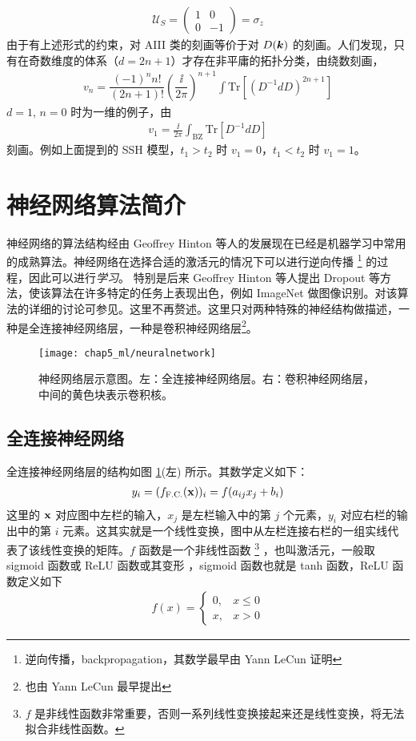 \begin{align}
\mathcal{U}_S = \begin{pmatrix}
1 & 0 \\
0 & -1 
\end{pmatrix} 
= \sigma_z
\end{align}
由于有上述形式的约束，对 AIII 类的刻画等价于对 $D(\boldsymbol{k})$ 的刻画。人们发现，只有在奇数维度的体系（$d=2n+1$）才存在非平庸的拓扑分类，由绕数刻画，
\begin{align}
v_n = \dfrac{(-1)^nn!}{(2n+1)!}\left(\dfrac{\ii}{2\pi}\right)^{n+1}
\int\text{Tr}[(D^{-1}dD)^{2n+1}]
\end{align}
$d=1$, $n=0$ 时为一维的例子，由
\begin{align}
v_1 = \frac{\ii}{2\pi}\int_{\text{BZ}}\text{Tr}[D^{-1}dD]
\end{align}
刻画。例如上面提到的 SSH 模型，$t_1>t_2$ 时 $v_1=0$，$t_1<t_2$ 时 $v_1=1$。



\section{神经网络算法简介} \label{sec:neuralnetwork}
神经网络的算法结构经由 Geoffrey Hinton 等人的发展现在已经是机器学习中常用的成熟算法。神经网络在选择合适的激活元的情况下可以进行逆向传播
\footnote{逆向传播，backpropagation，其数学最早由 Yann LeCun 证明}
的过程，因此可以进行\textit{学习}。
特别是后来 Geoffrey Hinton 等人提出 Dropout 等方法，使该算法在许多特定的任务上表现出色，例如 ImageNet 做图像识别\cite{imagenet2012}。对该算法的详细的讨论可参见\cite{prmlbook}。这里不再赘述。这里只对两种特殊的神经结构做描述，一种是全连接神经网络层，一种是卷积神经网络层\footnote{也由 Yann LeCun 最早提出}。

\begin{figure}[t]
\centering
\texttt{[image: chap5\_ml/neuralnetwork]}
\caption{神经网络层示意图。左：全连接神经网络层。右：卷积神经网络层，中间的黄色块表示卷积核。}
\label{fig:nn}
\end{figure}


\subsection{全连接神经网络}
全连接神经网络层的结构如图 \ref{fig:nn}(左) 所示。其数学定义如下：
\begin{align}
y_i = (f_{\text{F.C.}}(\mathbf{x}))_i = f(a_{ij}x_j + b_i)
\end{align}
这里的 $\mathbf{x}$ 对应图中左栏的输入，$x_j$ 是左栏输入中的第 $j$ 个元素，$y_i$ 对应右栏的输出中的第 $i$ 元素。这其实就是一个线性变换，图中从左栏连接右栏的一组实线代表了该线性变换的矩阵。$f$ 函数是一个非线性函数
\footnote{$f$ 是非线性函数非常重要，否则一系列线性变换接起来还是线性变换，将无法拟合非线性函数。}
，也叫激活元，一般取 sigmoid 函数或 ReLU 函数或其变形 \cite{prmlbook,topoml} ，sigmoid 函数也就是 tanh 函数，ReLU 函数定义如下
\begin{align}
f(x) = \begin{cases}
0, & x\leq0 \\
x, & x>0
\end{cases}
\end{align}

